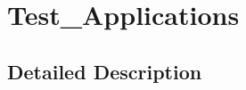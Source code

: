 \hypertarget{group___test___applications}{}\section{Test\+\_\+\+Applications}
\label{group___test___applications}


\subsection{Detailed Description}
